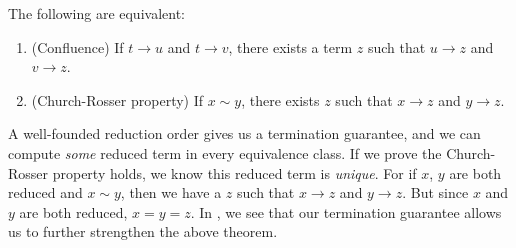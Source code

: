 \documentclass[../generics]{subfiles}
\begin{document}
\begin{theorem}\label{church rosser theorem}
The following are equivalent:
\begin{enumerate}
\item {}(Confluence) If $t\rightarrow u$ and $t\rightarrow v$, there exists a term $z$ such that $u\rightarrow z$ and $v\rightarrow z$.
\item {}(Church-Rosser property) If $x\sim y$, there exists $z$ such that $x\rightarrow z$ and $y\rightarrow z$.
\end{enumerate}
\end{theorem}
A well-founded reduction order gives us a termination guarantee, and we can compute \emph{some} reduced term in every equivalence class. If we prove the Church-Rosser property holds, we know this reduced term is \emph{unique}. For if $x$, $y$ are both reduced and $x\sim y$, then we have a $z$ such that $x\rightarrow z$ and $y\rightarrow z$. But since $x$ and $y$ are both reduced, $x=y=z$. In , we see that our termination guarantee allows us to further strengthen the above theorem.
\end{document}
